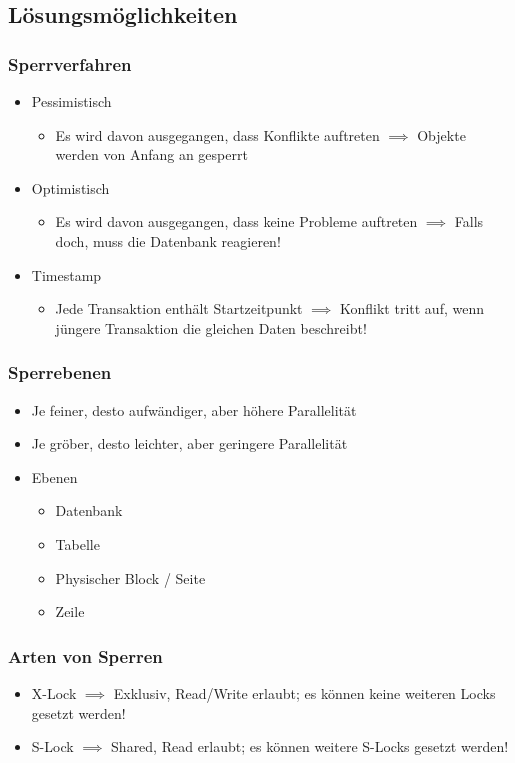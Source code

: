 \subsection{Lösungsmöglichkeiten}
\subsubsection{Sperrverfahren}
\begin{itemize}
    \item Pessimistisch
    \begin{itemize}
        \item Es wird davon ausgegangen, dass Konflikte auftreten $\implies$ Objekte werden von Anfang an gesperrt
    \end{itemize}
    \item Optimistisch
    \begin{itemize}
        \item Es wird davon ausgegangen, dass keine Probleme auftreten $\implies$ Falls doch, muss die Datenbank reagieren!
    \end{itemize}
    \item Timestamp
    \begin{itemize}
        \item Jede Transaktion enthält Startzeitpunkt $\implies$ Konflikt tritt auf, wenn jüngere Transaktion die gleichen Daten beschreibt!
    \end{itemize}
\end{itemize}
\subsubsection{Sperrebenen}
\begin{itemize}
    \item Je feiner, desto aufwändiger, aber höhere Parallelität
    \item Je gröber, desto leichter, aber geringere Parallelität
    \item Ebenen
    \begin{itemize}
        \item Datenbank
        \item Tabelle
        \item Physischer Block / Seite
        \item Zeile
    \end{itemize}
\end{itemize}
\subsubsection{Arten von Sperren}
\begin{itemize}
    \item X-Lock $\implies$ Exklusiv, Read/Write erlaubt; es können keine weiteren Locks gesetzt werden!
    \item S-Lock $\implies$ Shared, Read erlaubt; es können weitere S-Locks gesetzt werden!
\end{itemize}

